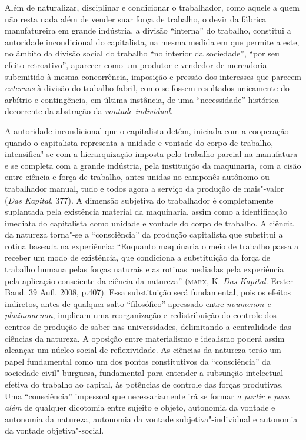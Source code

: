 Além de naturalizar, disciplinar e condicionar o trabalhador, como
aquele a quem não resta nada além de vender suar força de trabalho, o
devir da fábrica manufatureira em grande indústria, a divisão
``interna'' do trabalho, constitui a autoridade incondicional do
capitalista, na mesma medida em que permite a este, no âmbito da divisão
social do trabalho ``no interior da sociedade'', ``por seu efeito
retroativo'', aparecer como um produtor e vendedor de mercadoria
subemitido à mesma concorrência, imposição e pressão dos interesses que
parecem \emph{externos} à divisão do trabalho fabril, como se fossem
resultados unicamente do arbítrio e contingência, em última instância,
de uma ``necessidade'' histórica decorrente da abstração da
\emph{vontade} \emph{individual}.

A autoridade incondicional que o capitalista detém, iniciada com a
cooperação quando o capitalista representa a unidade e vontade do corpo
de trabalho, intensifica"-se com a hierarquização imposta pelo trabalho
parcial na manufatura e se completa com a grande indústria, pela
instituição da maquinaria, com a cisão entre ciência e força de
trabalho, antes unidas no camponês autônomo ou trabalhador manual, tudo
e todos agora a serviço da produção de mais"-valor (\emph{Das Kapital},
377). A dimensão subjetiva do trabalhador é completamente suplantada
pela existência material da maquinaria, assim como a identificação
imediata do capitalista como unidade e vontade do corpo de trabalho. A
ciência da natureza torna"-se a ``consciência'' da produção capitalista
que substitui a rotina baseada na experiência: ``Enquanto maquinaria o
meio de trabalho passa a receber um modo de existência, que condiciona a
substituição da força de trabalho humana pelas forças naturais e as
rotinas mediadas pela experiência pela aplicação consciente da ciência
da natureza'' (\textsc{marx}, K. \emph{Das Kapital}. Erster Band. 39
Aufl. 2008, p.407). Essa substituição será fundamental, pois os efeitos
indiretos, antes de qualquer salto ``filosófico'' apressado entre
\emph{noumenon e phainomenon}, implicam uma reorganização e
redistribuição do controle dos centros de produção de saber nas
universidades, delimitando a centralidade das ciências da natureza. A
oposição entre materialismo e idealismo poderá assim alcançar um núcleo
social de reflexividade. As ciências da natureza terão um papel
fundamental como um dos pontos constitutivos da ``consciência'' da
sociedade civil"-burguesa, fundamental para entender a subsunção
intelectual efetiva do trabalho ao capital, às potências de controle das
forças produtivas. Uma ``consciência'' impessoal que necessariamente irá
se formar \emph{a partir e para além} de qualquer dicotomia entre
sujeito e objeto, autonomia da vontade e autonomia da natureza,
autonomia da vontade subjetiva"-individual e autonomia da vontade
objetiva"-social.

